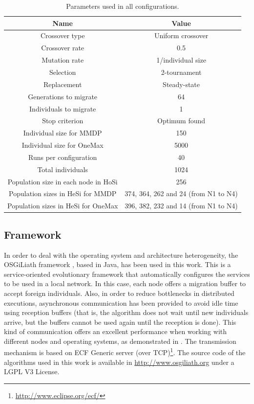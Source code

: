 \documentclass[final,1p,times]{elsarticle}
\begin{document}
\begin{table}
\centering
\caption{Parameters used in all configurations.}
\begin{tabular}{|c|c|} \hline
Name & Value\\ \hline

Crossover type & Uniform crossover \\ \hline
Crossover rate & 0.5\\ \hline
Mutation rate & 1/individual size\\ \hline
Selection & 2-tournament \\ \hline
Replacement & Steady-state\\ \hline
Generations to migrate & 64 \\ \hline
Individuals to migrate & 1 \\ \hline
Stop criterion & Optimum found \\ \hline
Individual size for MMDP & 150 \\ \hline
Individual size for OneMax & 5000 \\ \hline
Runs per configuration & 40 \\ \hline
\hline
Total individuals & 1024\\ \hline \hline
Population size in each node in HoSi & 256  \\ \hline
Population sizes in HeSi for MMDP & 374, 364, 262 and 24 (from N1 to N4)\\ \hline
Population sizes in HeSi for OneMax & 396,  382, 232 and 14 (from N1 to N4)\\ \hline
\hline\end{tabular}
\label{table:parameters}
\end{table}



\subsection{Framework}
In order to deal with the operating system and architecture heterogeneity, the OSGiLiath framework \cite{SOASOCO}, based in Java, has been used in this work. This is a service-oriented evolutionary framework that automatically configures the services to be used in a local network. In this case, each node offers a migration buffer to accept foreign individuals. Also, in order to reduce bottlenecks in distributed executions, asynchronous communication has been provided to avoid idle time using reception buffers (that is, the algorithm does not wait until new individuals arrive, but the buffers cannot be used again until the reception is done). This kind of communication offers an excellent performance when working with different nodes and operating systems, as demonstrated in \cite{HETEROGENEOUSHARD}. The transmission mechanism is based on ECF Generic server (over TCP)\footnote{\url{http://www.eclipse.org/ecf/}}.  The source code of the algorithms used in this work is available in \url{http://www.osgiliath.org} under a LGPL V3 License. 
\end{document}
